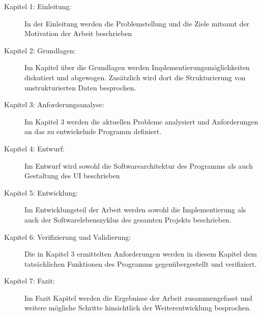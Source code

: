 \begin{description}

    \item[Kapitel 1: Einleitung:]
    In der Einleitung werden die Problemstellung und die Ziele mitsamt der Motivation
    der Arbeit beschrieben
    
    \item[Kapitel 2: Grundlagen:]
    Im Kapitel über die Grundlagen werden Implementierungsmöglichkeiten diskutiert
    und abgewogen. Zusätzlich wird dort die Strukturierung von unstrukturierten 
    Daten besprochen.

    \item[Kapitel 3: Anforderungsanalyse:]
    Im Kapitel 3 werden die aktuellen Probleme analysiert und Anforderungen an 
    das zu entwickelnde Programm definiert.

    \item[Kapitel 4: Entwurf:]
    Im Entwurf wird sowohl die Softwarearchitektur des Programms als auch Gestaltung 
    des \gls{UI} beschrieben
    
    \item[Kapitel 5: Entwicklung:]
    Im Entwicklungsteil der Arbeit werden sowohl die Implementierung als auch 
    der Softwarelebenszyklus des gesamten Projekts beschrieben.

    \item[Kapitel 6: Verifizierung und Validierung:]
    Die in Kapitel 3 ermittelten Anforderungen werden in diesem Kapitel dem 
    tatsächlichen Funktionen des Programms gegenübergestellt und verifiziert.

    \item[Kapitel 7: Fazit:]
    Im Fazit Kapitel werden die Ergebnisse der Arbeit zusammengefasst und weitere
    mögliche Schritte hinsichtlich der Weiterentwicklung besprochen.

\end{description}
\newpage





